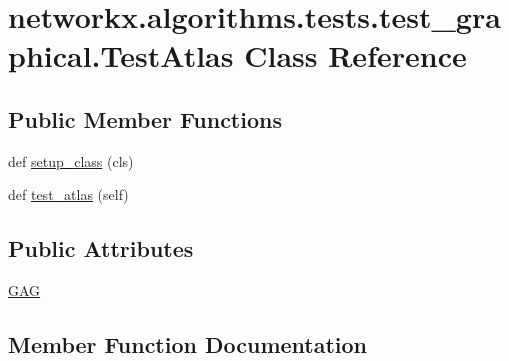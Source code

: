 \hypertarget{classnetworkx_1_1algorithms_1_1tests_1_1test__graphical_1_1TestAtlas}{}\section{networkx.\+algorithms.\+tests.\+test\+\_\+graphical.\+Test\+Atlas Class Reference}
\label{classnetworkx_1_1algorithms_1_1tests_1_1test__graphical_1_1TestAtlas}
\subsection*{Public Member Functions}
\begin{DoxyCompactItemize}
\item 
def \hyperlink{classnetworkx_1_1algorithms_1_1tests_1_1test__graphical_1_1TestAtlas_ab38db3eafeb4f4f8d99741ab95da6b68}{setup\+\_\+class} (cls)
\item 
def \hyperlink{classnetworkx_1_1algorithms_1_1tests_1_1test__graphical_1_1TestAtlas_a97752f14bcff1552a040f1461392c24c}{test\+\_\+atlas} (self)
\end{DoxyCompactItemize}
\subsection*{Public Attributes}
\begin{DoxyCompactItemize}
\item 
\hyperlink{classnetworkx_1_1algorithms_1_1tests_1_1test__graphical_1_1TestAtlas_a634e23849bb32fee9f931d6b4deae96a}{G\+AG}
\end{DoxyCompactItemize}


\subsection{Member Function Documentation}
\mbox{\label{classnetworkx_1_1algorithms_1_1tests_1_1test__graphical_1_1TestAtlas_ab38db3eafeb4f4f8d99741ab95da6b68}} 
